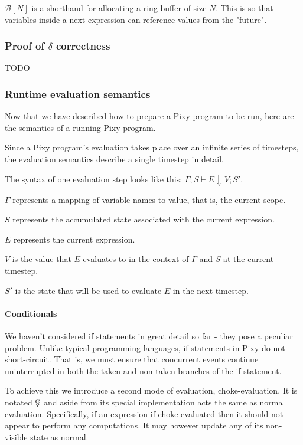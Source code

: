 \documentclass{scrartcl}
\DeclareMathOperator{\ceval}{\overset{C}{\smash{\Downarrow}}}
\begin{document}
    $\mathcal{B}[N]$ is a shorthand for allocating a ring buffer of size $N$. This is so that variables inside a next expression can reference values from the "future".
    
    \subsubsection{Proof of $\delta$ correctness}
    
    TODO
    
    \subsubsection{Runtime evaluation semantics}
    
    Now that we have described how to prepare a Pixy program to be run, here are the semantics of a running Pixy program.
    
    Since a Pixy program's evaluation takes place over an infinite series of timesteps, the evaluation semantics describe a single timestep in detail.
    
    The syntax of one evaluation step looks like this: $\Gamma; S \vdash E \Downarrow V; S'$.
    
    $\Gamma$ represents a mapping of variable names to value, that is, the current scope.
    
    $S$ represents the accumulated state associated with the current expression.
    
    $E$ represents the current expression.
    
    $V$ is the value that $E$ evaluates to in the context of $\Gamma$ and $S$ at the current timestep.
    
    $S'$ is the state that will be used to evaluate $E$ in the next timestep.
    
    \paragraph{Conditionals}
    
    We haven't considered if statements in great detail so far - they pose a peculiar problem. Unlike typical programming languages, if statements in Pixy do not short-circuit. That is, we must ensure that concurrent events continue uninterrupted in both the taken and non-taken branches of the if statement.
    
    To achieve this we introduce a second mode of evaluation, choke-evaluation. It is notated $\ceval$ and aside from its special implementation acts the same as normal evaluation. Specifically, if an expression if choke-evaluated then it should not appear to perform any computations. It may however update any of its non-visible state as normal.
    
\end{document}
